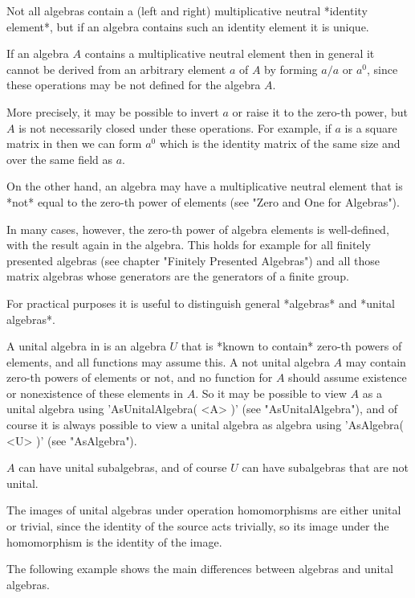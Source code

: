 
Not all algebras contain a (left and right) multiplicative neutral
*identity element*, but if an algebra contains such an identity element
it is unique.

If an algebra $A$ contains a multiplicative neutral element then in
general it cannot be derived from an arbitrary element $a$ of $A$ by
forming $a / a$ or $a^0$, since these operations may be not defined for
the algebra $A$.

More precisely, it may be possible to invert $a$ or raise it to the
zero-th power, but $A$ is not necessarily closed under these operations.
For example, if $a$ is a square matrix in {\GAP} then we can form $a^0$
which is the identity matrix of the same size and over the same field as
$a$.

On the other hand, an algebra may have a multiplicative neutral element
that is *not* equal to the zero-th power of elements (see "Zero and One
for Algebras").

In many cases, however, the zero-th power of algebra elements
is well-defined, with the result again in the algebra.  This holds for
example for all finitely presented algebras (see chapter "Finitely
Presented Algebras") and all those matrix algebras whose generators are
the generators of a finite group.

For practical purposes it is useful to distinguish general *algebras* and
*unital algebras*.

A unital algebra in {\GAP} is an algebra $U$ that is *known to contain*
zero-th powers of elements, and all functions may assume this.  A not unital
algebra $A$ may contain zero-th powers of elements or not, and no
function for $A$ should assume existence or nonexistence of these
elements in $A$.  So it may be possible to view $A$ as a unital algebra
using 'AsUnitalAlgebra( <A> )' (see "AsUnitalAlgebra"), and of course it
is always possible to view a unital algebra as algebra using
'AsAlgebra( <U> )' (see "AsAlgebra").

$A$ can have unital subalgebras, and of course $U$ can have subalgebras
that are not unital.

The images of unital algebras under operation homomorphisms are either
unital or trivial, since the identity of the source acts trivially, so
its image under the homomorphism is the identity of the image.

The following example shows the main differences between algebras and unital
algebras.

